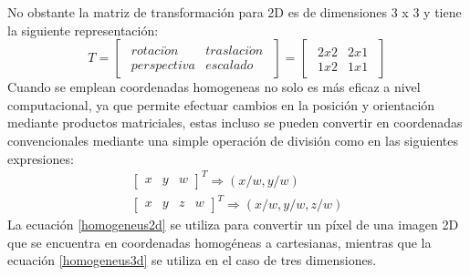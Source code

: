 No obstante la matriz de transformación para 2D es de dimensiones 3 x 3 y tiene la siguiente representación:
\begin{equation}
    T = \begin{bmatrix}
        \begin{array}{c|c}
                rotaci\acute{o}n & traslaci\acute{o}n\\
                \hline
                perspectiva & escalado
        \end{array}
        \end{bmatrix}
        =
        \begin{bmatrix}
        \begin{array}{c|c}
                2 x 2 & 2 x 1\\
                \hline
                1 x 2 & 1 x 1
        \end{array}
        \end{bmatrix}
\end{equation}
Cuando se emplean coordenadas homogeneas no solo es más eficaz a nivel computacional, ya que permite efectuar cambios en la posición y orientación mediante productos matriciales, estas incluso se pueden convertir en coordenadas convencionales mediante una simple operación de división como en las siguientes expresiones:
\begin{align}
\begin{bmatrix}
x & y & w
\end{bmatrix}^{T} \Rightarrow (x/w, y/w)\label{homogeneus2d}\\
\begin{bmatrix}
x & y & z & w
\end{bmatrix}^{T} \Rightarrow (x/w, y/w, z/w)\label{homogeneus3d}
\end{align}
La ecuación \ref{homogeneus2d} se utiliza para convertir un píxel de una imagen 2D que se encuentra en coordenadas homogéneas a cartesianas, mientras que la ecuación \ref{homogeneus3d} se utiliza en el caso de tres dimensiones.
